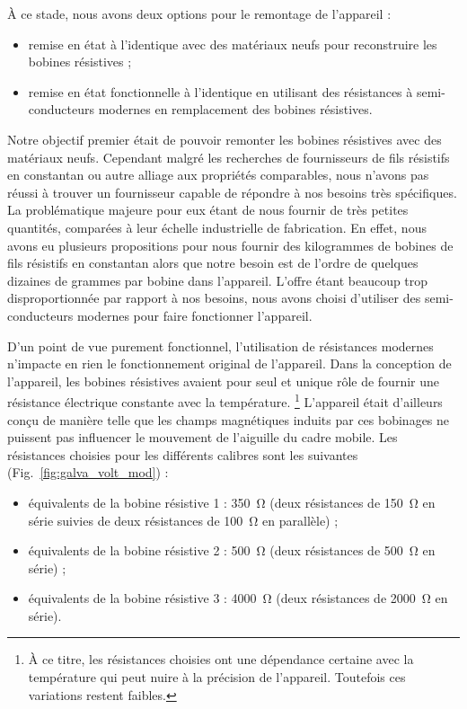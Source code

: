 \documentclass[12pt,a4paper,fleqn]{article}
\begin{document}
À ce stade, nous avons deux options pour le remontage de l'appareil :
\begin{itemize}
\item remise en état à l'identique avec des matériaux neufs pour reconstruire les bobines résistives ;
\item remise en état fonctionnelle à l'identique en utilisant des résistances à semi-conducteurs modernes en remplacement des bobines résistives.
\end{itemize}
Notre objectif premier était de pouvoir remonter les bobines résistives avec des matériaux neufs.
Cependant malgré les recherches de fournisseurs de fils résistifs en constantan ou autre alliage aux propriétés comparables, nous n'avons pas réussi à trouver un fournisseur capable de répondre à nos besoins très spécifiques.
La problématique majeure pour eux étant de nous fournir de très petites quantités, comparées à leur échelle industrielle de fabrication.
En effet, nous avons eu plusieurs propositions pour nous fournir des kilogrammes de bobines de fils résistifs en constantan alors que notre besoin est de l'ordre de quelques dizaines de grammes par bobine dans l'appareil.
L'offre étant beaucoup trop disproportionnée par rapport à nos besoins, nous avons choisi d'utiliser des semi-conducteurs modernes pour faire fonctionner l'appareil.

D'un point de vue purement fonctionnel, l'utilisation de résistances modernes n'impacte en rien le fonctionnement original de l'appareil.
Dans la conception de l'appareil, les bobines résistives avaient pour seul et unique rôle de fournir une résistance électrique constante avec la température.
\footnote{À ce titre, les résistances choisies ont une dépendance certaine avec la température qui peut nuire à la précision de l'appareil.
Toutefois ces variations restent faibles.}
L'appareil était d'ailleurs conçu de manière telle que les champs magnétiques induits par ces bobinages ne puissent pas influencer le mouvement de l'aiguille du cadre mobile.
Les résistances choisies pour les différents calibres sont les suivantes (Fig.~\ref{fig:galva_volt_mod}) :
\begin{itemize}
\item équivalents de la bobine résistive 1 : \qty{350}{\ohm} (deux résistances de \qty{150}{\ohm} en série suivies de deux résistances de \qty{100}{\ohm} en parallèle) ;
\item équivalents de la bobine résistive 2 : \qty{500}{\ohm} (deux résistances de \qty{500}{\ohm} en série) ;
\item équivalents de la bobine résistive 3 : \qty{4000}{\ohm} (deux résistances de \qty{2000}{\ohm} en série).
\end{itemize}
\end{document}
